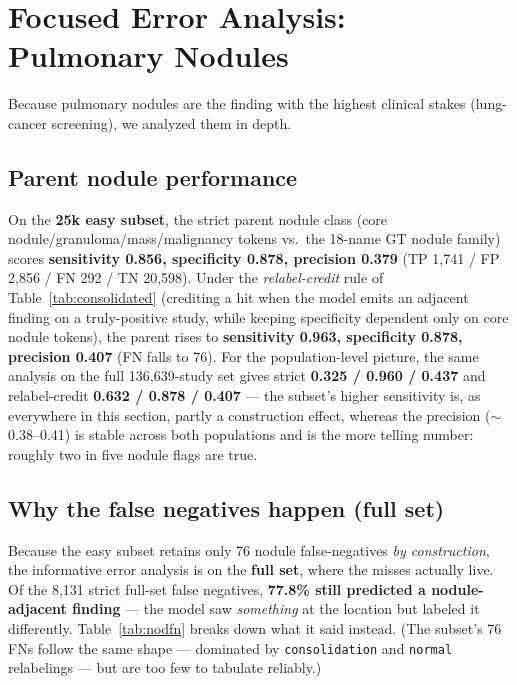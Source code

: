 \documentclass[11pt,a4paper]{article}
\begin{document}
\section{Focused Error Analysis: Pulmonary Nodules}
\label{sec:nodule}

Because pulmonary nodules are the finding with the highest clinical stakes (lung-cancer screening), we analyzed them in depth.

\subsection{Parent nodule performance}
On the \textbf{25k easy subset}, the strict parent nodule class (core nodule/granuloma/mass/malignancy tokens vs.\ the 18-name GT nodule family) scores \textbf{sensitivity 0.856, specificity 0.878, precision 0.379} (TP 1{,}741 / FP 2{,}856 / FN 292 / TN 20{,}598). Under the \emph{relabel-credit} rule of Table~\ref{tab:consolidated} (crediting a hit when the model emits an adjacent finding on a truly-positive study, while keeping specificity dependent only on core nodule tokens), the parent rises to \textbf{sensitivity 0.963, specificity 0.878, precision 0.407} (FN falls to 76). For the population-level picture, the same analysis on the full 136{,}639-study set gives strict \textbf{0.325 / 0.960 / 0.437} and relabel-credit \textbf{0.632 / 0.878 / 0.407} --- the subset's higher sensitivity is, as everywhere in this section, partly a construction effect, whereas the precision ($\sim$0.38--0.41) is stable across both populations and is the more telling number: roughly two in five nodule flags are true.

\subsection{Why the false negatives happen (full set)}
Because the easy subset retains only 76 nodule false-negatives \emph{by construction}, the informative error analysis is on the \textbf{full set}, where the misses actually live. Of the 8{,}131 strict full-set false negatives, \textbf{77.8\% still predicted a nodule-adjacent finding} --- the model saw \emph{something} at the location but labeled it differently. Table~\ref{tab:nodfn} breaks down what it said instead. (The subset's 76 FNs follow the same shape --- dominated by \texttt{consolidation} and \texttt{normal} relabelings --- but are too few to tabulate reliably.)
\end{document}
